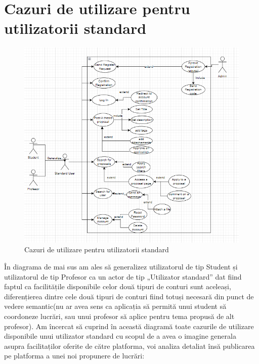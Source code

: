 \documentclass[12pt,a4paper,hidelinks]{report}
\theoremstyle{definition}
\theoremstyle{remark}
\begin{document}
\section{Cazuri de utilizare pentru utilizatorii standard}
\begin{figure}[h]
    \centering
    \includegraphics[scale=0.5]{images/StandardUserUseCase.png}
    \caption{Cazuri de utilizare pentru utilizatorii standard}
    \label{fig:stdUserDiagram}
\end{figure}
În diagrama de mai sus am ales să generalizez utilizatorul de tip Student și utilizatorul de tip Profesor ca un actor de tip „Utilizator standard” dat fiind faptul ca facilitățile disponibile celor  două tipuri de conturi sunt aceleași, diferențierea dintre cele două tipuri de conturi fiind totuși necesară din punct de vedere semantic(nu ar avea sens ca aplicația să permită unui student să coordoneze lucrări, sau unui profesor să aplice pentru tema propusă de alt profesor). Am încercat să cuprind în această diagramă toate cazurile de utilizare disponibile  unui utilizator standard cu scopul de a avea o imagine generala asupra facilitaților oferite de către platforma, voi analiza detaliat însă publicarea pe platforma a unei noi propunere de lucrări:
\end{document}
